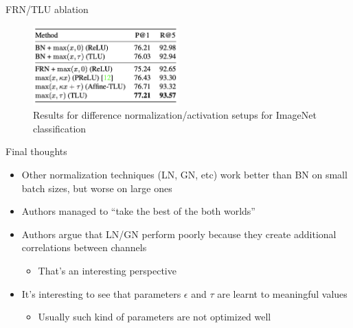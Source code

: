 \documentclass[handout, 10pt]{beamer}
\begin{document}
\begin{frame}{FRN/TLU ablation}
\begin{figure}
\centering
\includegraphics[width=0.5\textwidth]{images/frn-tlu-ablation.png}
\caption{Results for difference normalization/activation setups for ImageNet classification}
\end{figure}
\end{frame}


\begin{frame}{Final thoughts}
\begin{itemize}
    \item\pause Other normalization techniques (LN, GN, etc) work better than BN on small batch sizes, but worse on large ones
    \item\pause Authors managed to ``take the best of the both worlds'' 
    \item\pause Authors argue that LN/GN perform poorly because they create additional correlations between channels
    \begin{itemize}
        \item\pause That's an interesting perspective
    \end{itemize}
    \item\pause It's interesting to see that parameters $\epsilon$ and $\tau$ are learnt to meaningful values
    \begin{itemize}
        \item\pause Usually such kind of parameters are not optimized well
    \end{itemize}
\end{itemize}
\end{frame}
\end{document}
